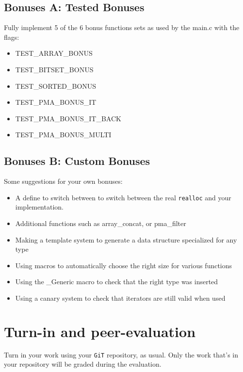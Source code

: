 \documentclass{42-en}
\begin{document}
    \section{Bonuses A: Tested Bonuses}
        Fully implement 5 of the 6 bonus functions sets as used by the main.c with the flags:
        \begin{itemize}\itemsep1pt
            \item TEST\_ARRAY\_BONUS
            \item TEST\_BITSET\_BONUS
            \item TEST\_SORTED\_BONUS
            \item TEST\_PMA\_BONUS\_IT
            \item TEST\_PMA\_BONUS\_IT\_BACK
            \item TEST\_PMA\_BONUS\_MULTI
        \end{itemize}
    
    \section{Bonuses B: Custom Bonuses}
        Some suggestions for your own bonuses:
        \begin{itemize}\itemsep7pt
            \item A define to switch between to switch between the real \texttt{realloc} and your implementation.
            \item Additional functions such as array\_concat, or pma\_filter
            \item Making a template system to generate a data structure specialized for any type
            \item Using macros to automatically choose the right size for various functions
            \item Using the \_Generic macro to check that the right type was inserted
            \item Using a canary system to check that iterators are still valid when used
        \end{itemize}


\chapter{Turn-in and peer-evaluation}

    Turn in your work using your \texttt{GiT} repository, as
    usual. Only the work that's in your repository will be graded during
    the evaluation.



\end{document}
